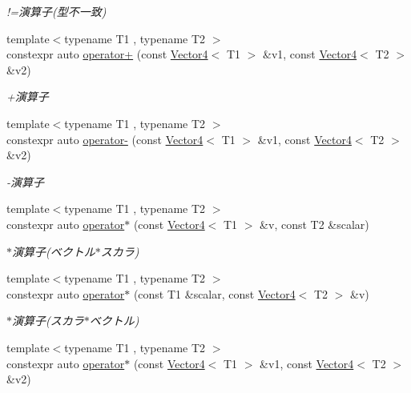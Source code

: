 \begin{DoxyCompactItemize}
\begin{DoxyCompactList}\small\item\em !=演算子(型不一致) \end{DoxyCompactList}\item 
{\footnotesize template$<$typename T1 , typename T2 $>$ }\\constexpr auto \mbox{\hyperlink{namespacesaki_a30ce7f379800f5d94b03c358574ba7b5}{operator+}} (const \mbox{\hyperlink{classsaki_1_1_vector4}{Vector4}}$<$ T1 $>$ \&v1, const \mbox{\hyperlink{classsaki_1_1_vector4}{Vector4}}$<$ T2 $>$ \&v2)
\begin{DoxyCompactList}\small\item\em +演算子 \end{DoxyCompactList}\item 
{\footnotesize template$<$typename T1 , typename T2 $>$ }\\constexpr auto \mbox{\hyperlink{namespacesaki_aa6f77e55cd25224c27c218790d7b1bf1}{operator-\/}} (const \mbox{\hyperlink{classsaki_1_1_vector4}{Vector4}}$<$ T1 $>$ \&v1, const \mbox{\hyperlink{classsaki_1_1_vector4}{Vector4}}$<$ T2 $>$ \&v2)
\begin{DoxyCompactList}\small\item\em -\/演算子 \end{DoxyCompactList}\item 
{\footnotesize template$<$typename T1 , typename T2 $>$ }\\constexpr auto \mbox{\hyperlink{namespacesaki_a856b63c2955b0387574c0b5e6d3c0b87}{operator$\ast$}} (const \mbox{\hyperlink{classsaki_1_1_vector4}{Vector4}}$<$ T1 $>$ \&v, const T2 \&scalar)
\begin{DoxyCompactList}\small\item\em $\ast$演算子(ベクトル$\ast$スカラ) \end{DoxyCompactList}\item 
{\footnotesize template$<$typename T1 , typename T2 $>$ }\\constexpr auto \mbox{\hyperlink{namespacesaki_adb31a759973c1c3d861bcaa5375f58bd}{operator$\ast$}} (const T1 \&scalar, const \mbox{\hyperlink{classsaki_1_1_vector4}{Vector4}}$<$ T2 $>$ \&v)
\begin{DoxyCompactList}\small\item\em $\ast$演算子(スカラ$\ast$ベクトル) \end{DoxyCompactList}\item 
{\footnotesize template$<$typename T1 , typename T2 $>$ }\\constexpr auto \mbox{\hyperlink{namespacesaki_a7bddc36f87a91453fa188323d7bbdaee}{operator$\ast$}} (const \mbox{\hyperlink{classsaki_1_1_vector4}{Vector4}}$<$ T1 $>$ \&v1, const \mbox{\hyperlink{classsaki_1_1_vector4}{Vector4}}$<$ T2 $>$ \&v2)

\end{DoxyCompactItemize}
